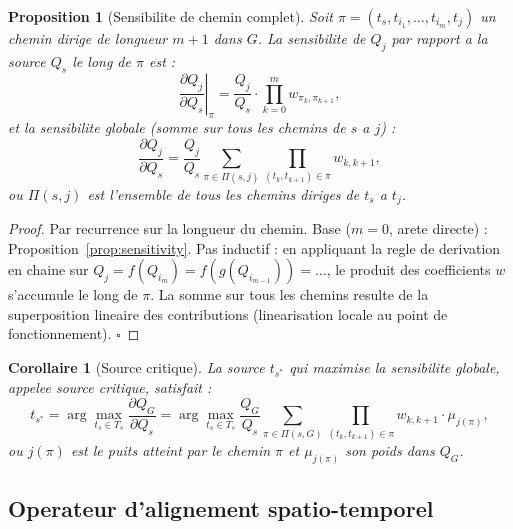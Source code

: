 \documentclass[12pt,a4paper]{article}
\theoremstyle{plain}
\newtheorem{proposition}[theorem]{Proposition}
\newtheorem{corollary}[theorem]{Corollaire}
\theoremstyle{definition}
\theoremstyle{remark}
\begin{document}
	\begin{proposition}[Sensibilite de chemin complet]
		\label{prop:path_sensitivity}
		Soit $\pi = (t_{s}, t_{i_1}, \ldots, t_{i_m}, t_j)$ un chemin dirige
		de longueur $m+1$ dans $G$. La sensibilite de $Q_j$ par rapport
		a la source $Q_s$ le long de $\pi$ est :
		\begin{equation}
			\left.\frac{\partial Q_j}{\partial Q_s}\right|_\pi
			= \frac{Q_j}{Q_s}
			\cdot \prod_{k=0}^{m} w_{\pi_k, \pi_{k+1}},
			\label{eq:sens_path}
		\end{equation}
		et la sensibilite globale (somme sur tous les chemins de $s$ a $j$) :
		\begin{equation}
			\frac{\partial Q_j}{\partial Q_s}
			= \frac{Q_j}{Q_s}
			\sum_{\pi \in \Pi(s,j)}
			\prod_{(t_k,t_{k+1})\in\pi} w_{k,k+1},
			\label{eq:sens_global}
		\end{equation}
		ou $\Pi(s,j)$ est l'ensemble de tous les chemins diriges de $t_s$ a $t_j$.
	\end{proposition}
	
	\begin{proof}
		Par recurrence sur la longueur du chemin.
		Base ($m=0$, arete directe) : Proposition~\ref{prop:sensitivity}.
		Pas inductif : en appliquant la regle de derivation en chaine sur
		$Q_j = f(Q_{i_m}) = f(g(Q_{i_{m-1}})) = \ldots$, le produit des
		coefficients $w$ s'accumule le long de $\pi$.
		La somme sur tous les chemins resulte de la superposition lineaire
		des contributions (linearisation locale au point de fonctionnement).
		\hfill$\square$
	\end{proof}
	
	\begin{corollary}[Source critique]
		\label{cor:critical_source}
		La source $t_{s^*}$ qui maximise la sensibilite globale, appelee
		\emph{source critique}, satisfait :
		\begin{equation}
			t_{s^*} = \arg\max_{t_s \in T_s}
			\frac{\partial Q_G}{\partial Q_s}
			= \arg\max_{t_s \in T_s}
			\frac{Q_G}{Q_s}
			\sum_{\pi \in \Pi(s,G)} \prod_{(t_k,t_{k+1})\in\pi} w_{k,k+1} \cdot \mu_{j(\pi)},
			\label{eq:critical}
		\end{equation}
		ou $j(\pi)$ est le puits atteint par le chemin $\pi$ et $\mu_{j(\pi)}$
		son poids dans $Q_G$.
	\end{corollary}
	
	\subsection{Operateur d'alignement spatio-temporel}
	\label{subsec:sta_formal}
	
\end{document}
